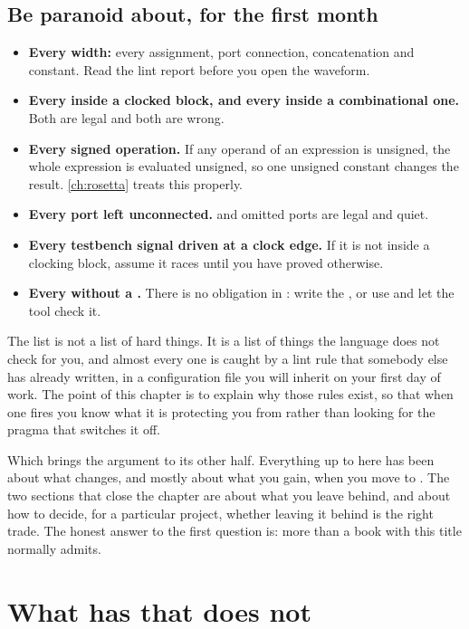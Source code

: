 \subsection{Be paranoid about, for the first month}

\begin{itemize}
\item \textbf{Every width:} every assignment, port connection, concatenation
  and constant. Read the lint report before you open the waveform.
\item \textbf{Every \code{=} inside a clocked block, and every \code{<=} inside
  a combinational one.} Both are legal and both are wrong.
\item \textbf{Every signed operation.} If any operand of an expression is
  unsigned, the whole expression is evaluated unsigned, so one unsigned
  constant changes the result. \cref{ch:rosetta} treats this properly.
\item \textbf{Every port left unconnected.}  and omitted ports are
  legal and quiet.
\item \textbf{Every testbench signal driven at a clock edge.} If it is not
  inside a clocking block, assume it races until you have proved otherwise.
\item \textbf{Every  without a .} There is no
   obligation in \SV{}: write the , or use
   and let the tool check it.
\end{itemize}

The list is not a list of hard things. It is a list of things the language does
not check for you, and almost every one is caught by a lint rule that somebody
else has already written, in a configuration file you will inherit on your
first day of work. The point of this chapter is to explain why those rules
exist, so that when one fires you know what it is protecting you from rather
than looking for the pragma that switches it off.

Which brings the argument to its other half. Everything up to here has been
about what changes, and mostly about what you gain, when you move to \SV{}.
The two sections that close the chapter are about what you leave behind, and
about how to decide, for a particular project, whether leaving it behind is
the right trade. The honest answer to the first question is: more than a book
with this title normally admits.

\section{What \VHDL{} has that \SV{} does not}
\label{sec:philosophy:vhdlwins}
\label{sec:beyond:vhdlwins}

